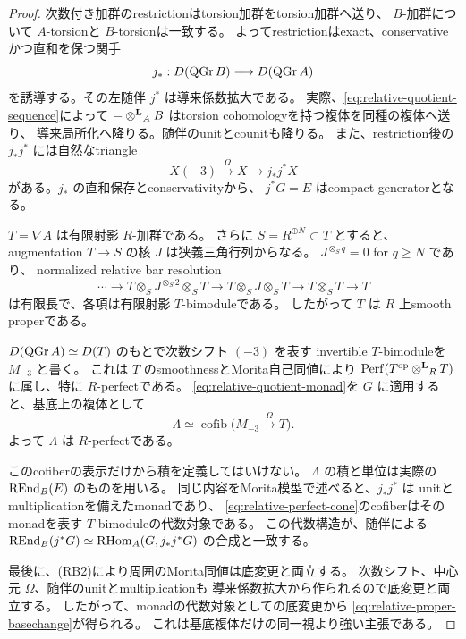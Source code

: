 \begin{proof}
 次数付き加群のrestrictionはtorsion加群をtorsion加群へ送り、
 \(B\)-加群について \(A\)-torsionと \(B\)-torsionは一致する。
 よってrestrictionはexact、conservativeかつ直和を保つ関手
 \[
 j_*:D(\operatorname{QGr} B)\longrightarrow D(\operatorname{QGr} A)
 \]
 を誘導する。その左随伴 \(j^*\) は導来係数拡大である。
 実際、\eqref{eq:relative-quotient-sequence}によって
 \(-\mathbin{\otimes^{\mathbf L}}_A B\) はtorsion cohomologyを持つ複体を同種の複体へ送り、
 導来局所化へ降りる。随伴のunitとcounitも降りる。
 また、restriction後の \(j_*j^*\) には自然なtriangle
 \[
 X(-3)\xrightarrow{\Omega}X\longrightarrow j_*j^*X
 \tag{M}\label{eq:relative-quotient-monad}
 \]
 がある。\(j_*\) の直和保存とconservativityから、
 \(j^*G=E\) はcompact generatorとなる。

 \(T=\nabla A\) は有限射影 \(R\)-加群である。
 さらに \(S=R^{\oplus N}\subset T\) とすると、
 augmentation \(T\to S\) の核 \(J\) は狭義三角行列からなる。
 \(J^{\otimes_S q}=0\) for \(q\ge N\) であり、
 normalized relative bar resolution
 \[
 \cdots\longrightarrow
 T\otimes_SJ^{\otimes_S2}\otimes_ST
 \longrightarrow T\otimes_SJ\otimes_ST
 \longrightarrow T\otimes_ST\longrightarrow T
 \]
 は有限長で、各項は有限射影 \(T\)-bimoduleである。
 したがって \(T\) は \(R\) 上smooth properである。

 \(D(\operatorname{QGr} A)\simeq D(T)\) のもとで次数シフト \((-3)\) を表す
 invertible \(T\)-bimoduleを \(M_{-3}\) と書く。
 これは \(T\) のsmoothnessとMorita自己同値により
 \(\operatorname{Perf}(T^{\mathrm{op}}\mathbin{\otimes^{\mathbf L}}_RT)\) に属し、特に \(R\)-perfectである。
 \eqref{eq:relative-quotient-monad}を \(G\) に適用すると、基底上の複体として
 \[
 \Lambda\simeq
 \operatorname{cofib}\bigl(M_{-3}\xrightarrow{\Omega}T\bigr).
 \tag{C}\label{eq:relative-perfect-cone}
 \]
 よって \(\Lambda\) は \(R\)-perfectである。

 このcofiberの表示だけから積を定義してはいけない。
 \(\Lambda\) の積と単位は実際の \(\operatorname{REnd}_B(E)\) のものを用いる。
 同じ内容をMorita模型で述べると、\(j_*j^*\) は
 unitとmultiplicationを備えたmonadであり、
 \eqref{eq:relative-perfect-cone}のcofiberはそのmonadを表す
 \(T\)-bimoduleの代数対象である。
 この代数構造が、随伴による
 \(\operatorname{REnd}_B(j^*G)\simeq\operatorname{RHom}_A(G,j_*j^*G)\) の合成と一致する。

 最後に、(RB2)により周囲のMorita同値は底変更と両立する。
 次数シフト、中心元 \(\Omega\)、随伴のunitとmultiplicationも
 導来係数拡大から作られるので底変更と両立する。
 したがって、monadの代数対象としての底変更から
 \eqref{eq:relative-proper-basechange}が得られる。
 これは基底複体だけの同一視より強い主張である。
\end{proof}

